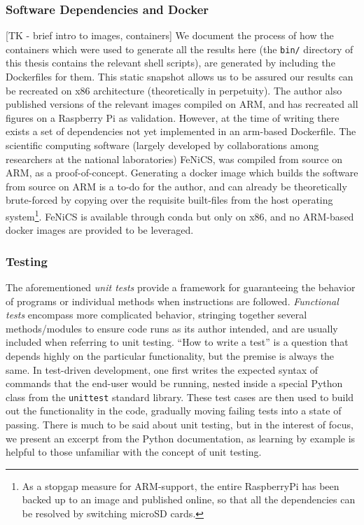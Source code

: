 \subsubsection{Software Dependencies and Docker}\label{sec:docker}
[TK - brief intro to images, containers]
We document the process of how the containers which were used to generate all the results here (the {\tt bin/} directory of this thesis contains the relevant shell scripts), are generated by including the Dockerfiles for them.
This static snapshot allows us to be assured our results can be recreated on x86 architecture (theoretically in perpetuity).
The author also published versions of the relevant images compiled on ARM, and has recreated all figures on a Raspberry Pi as validation.
However, at the time of writing there exists a set of dependencies not yet implemented in an arm-based Dockerfile.
The scientific computing software (largely developed by collaborations among researchers at the national laboratories) FeNiCS, was compiled from source on ARM, as a proof-of-concept.
Generating a docker image which builds the software from source on ARM is a to-do for the author, and can already be theoretically brute-forced by copying over the requisite built-files from the host operating system\footnote{As a stopgap measure for ARM-support, the entire RaspberryPi has been backed up to an image and published online, so that all the dependencies can be resolved by switching microSD cards.}.
FeNiCS is available through conda but only on x86, and no ARM-based docker images are provided to be leveraged.


\subsubsection{Testing}\label{sec:unit-testing}
The aforementioned \emph{unit tests} provide a framework for guaranteeing the behavior of programs or individual methods when instructions are followed.
\emph{Functional tests} encompass more complicated behavior, stringing together several methods/modules to ensure code runs as its author intended, and are usually included when referring to unit testing.
``How to write a test'' is a question that depends highly on the particular functionality, but the premise is always the same.
In test-driven development, one first writes the expected syntax of commands that the end-user would be running, nested inside a special Python class from the {\tt unittest} standard library.
These test cases are then used to build out the functionality in the code, gradually moving failing tests into a state of passing. 
There is much to be said about unit testing, but in the interest of focus, we present an excerpt from the Python documentation, as learning by example is helpful to those unfamiliar with the concept of unit testing. 

